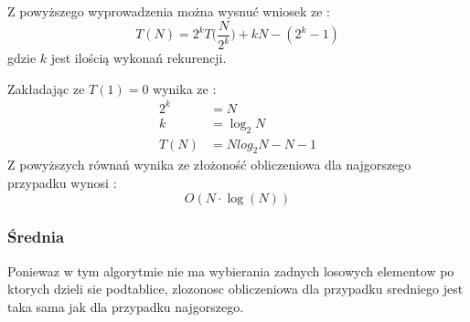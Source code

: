 Z powyższego wyprowadzenia można wysnuć wniosek ze :
\begin{equation*}
T(N) = 2^k T\Big(\frac{N}{2^k} \Big) +kN -(2^k -1)
\end{equation*}
gdzie $k$ jest ilością wykonań rekurencji.\\
\par Zakładając ze $T(1) = 0$ wynika ze :
\begin{align*}
2^k &= N \\
k &= \log_2 N \\
T(N) &= N log_2 N -N -1
\end{align*}
Z powyższych równań wynika ze złożoność obliczeniowa dla najgorszego przypadku wynosi :
\begin{equation*}
O(N \cdot \log(N))
\end{equation*}

\subsubsection{Średnia}
Poniewaz w tym algorytmie nie ma wybierania zadnych losowych elementow po ktorych dzieli sie podtablice, zlozonosc obliczeniowa dla przypadku sredniego jest taka sama jak dla przypadku najgorszego\cite{mergesortAVG}.